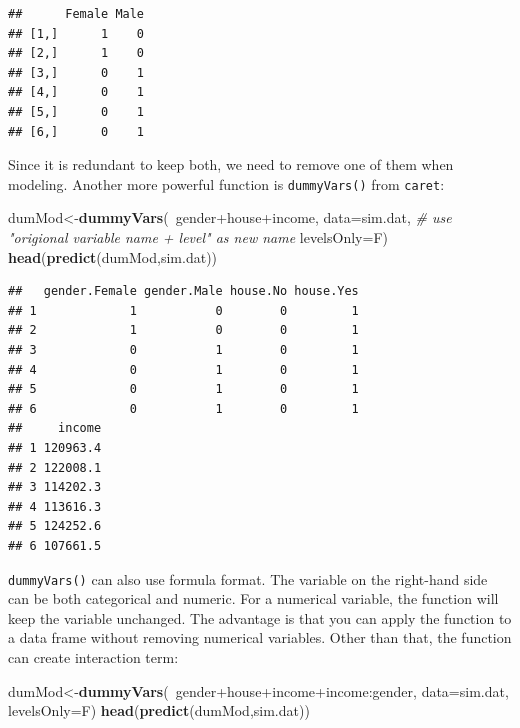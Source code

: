\documentclass[12pt,]{krantz}
\newenvironment{Shaded}{\begin{snugshade}}{\end{snugshade}}
\newcommand{\KeywordTok}[1]{\textcolor[rgb]{0.13,0.29,0.53}{\textbf{{#1}}}}
\newcommand{\DataTypeTok}[1]{\textcolor[rgb]{0.13,0.29,0.53}{{#1}}}
\newcommand{\CommentTok}[1]{\textcolor[rgb]{0.56,0.35,0.01}{\textit{{#1}}}}
\newcommand{\NormalTok}[1]{{#1}}
\theoremstyle{definition}
\theoremstyle{definition}
\theoremstyle{remark}
\begin{document}
\begin{verbatim}
##      Female Male
## [1,]      1    0
## [2,]      1    0
## [3,]      0    1
## [4,]      0    1
## [5,]      0    1
## [6,]      0    1
\end{verbatim}

Since it is redundant to keep both, we need to remove one of them when
modeling. Another more powerful function is \texttt{dummyVars()} from
\texttt{caret}:

\begin{Shaded}
\begin{Highlighting}[]
\NormalTok{dumMod<-}\KeywordTok{dummyVars}\NormalTok{(~gender+house+income,}
                  \DataTypeTok{data=}\NormalTok{sim.dat,}
                  \CommentTok{# use "origional variable name + level" as new name}
                  \DataTypeTok{levelsOnly=}\NormalTok{F)}
\KeywordTok{head}\NormalTok{(}\KeywordTok{predict}\NormalTok{(dumMod,sim.dat))}
\end{Highlighting}
\end{Shaded}

\begin{verbatim}
##   gender.Female gender.Male house.No house.Yes
## 1             1           0        0         1
## 2             1           0        0         1
## 3             0           1        0         1
## 4             0           1        0         1
## 5             0           1        0         1
## 6             0           1        0         1
##     income
## 1 120963.4
## 2 122008.1
## 3 114202.3
## 4 113616.3
## 5 124252.6
## 6 107661.5
\end{verbatim}

\texttt{dummyVars()} can also use formula format. The variable on the
right-hand side can be both categorical and numeric. For a numerical
variable, the function will keep the variable unchanged. The advantage
is that you can apply the function to a data frame without removing
numerical variables. Other than that, the function can create
interaction term:

\begin{Shaded}
\begin{Highlighting}[]
\NormalTok{dumMod<-}\KeywordTok{dummyVars}\NormalTok{(~gender+house+income+income:gender,}
                  \DataTypeTok{data=}\NormalTok{sim.dat,}
                  \DataTypeTok{levelsOnly=}\NormalTok{F)}
\KeywordTok{head}\NormalTok{(}\KeywordTok{predict}\NormalTok{(dumMod,sim.dat))}
\end{Highlighting}
\end{Shaded}
\end{document}
